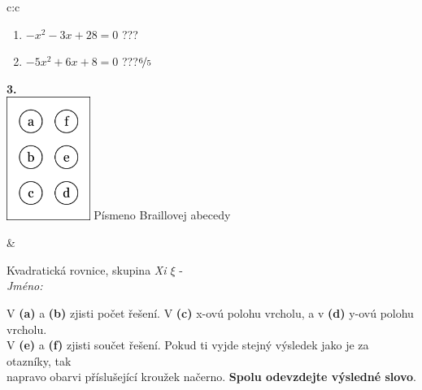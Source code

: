 \documentclass[10pt]{report}
\begin{document}
\begin{tabular}{c:c}
\begin{minipage}[c][104.5mm][t]{0.5\linewidth}
\begin{center}
\begin{minipage}{0.79\linewidth}
\begin{center}
\begin{varwidth}{\linewidth}
\begin{enumerate}
\item $-x^2-3x+28=0$\quad \dotfill\; ???\;\dotfill {}
\item $-5x^2+6x+8=0$\quad \dotfill\; ???\;\dotfill \quad $\nicefrac{6}{5}$
\end{enumerate}
\end{varwidth}
\end{center}
\end{minipage}
\begin{minipage}{0.20\linewidth}
\begin{center}
{\Huge\bfseries 3.} \\[2mm]
\includegraphics[height=40mm]{../images/braille.png}
{\small Písmeno Braillovej abecedy}
\end{center}
\end{minipage}
\end{center}
\end{minipage}
&
\begin{minipage}[c][104.5mm][t]{0.5\linewidth}
\begin{center}
\vspace{7mm}
{\huge Kvadratická rovnice, skupina \textit{Xi $\xi$} -}\\[5mm]
\textit{Jméno:}\phantom{xxxxxxxxxxxxxxxxxxxxxxxxxxxxxxxxxxxxxxxxxxxxxxxxxxxxxxxxxxxxxxxxx}\\[5mm]
\begin{minipage}{0.95\linewidth}
\begin{center}
V \textbf{(a)} a \textbf{(b)} zjisti počet řešení. V \textbf{(c)} x-ovú polohu vrcholu, a v \textbf{(d)} y-ovú polohu vrcholu.\\V \textbf{(e)} a \textbf{(f)} zjisti součet řešení. Pokud ti vyjde stejný výsledek jako je za otazníky, tak\\napravo obarvi příslušející kroužek načerno. \textbf{Spolu odevzdejte výsledné slovo}.
\end{center}
\end{minipage}
\\[1mm]
\begin{minipage}{0.79\linewidth}
\begin{center}

\end{center}
\end{minipage}
\end{center}
\end{minipage}
\end{tabular}
\end{document}
